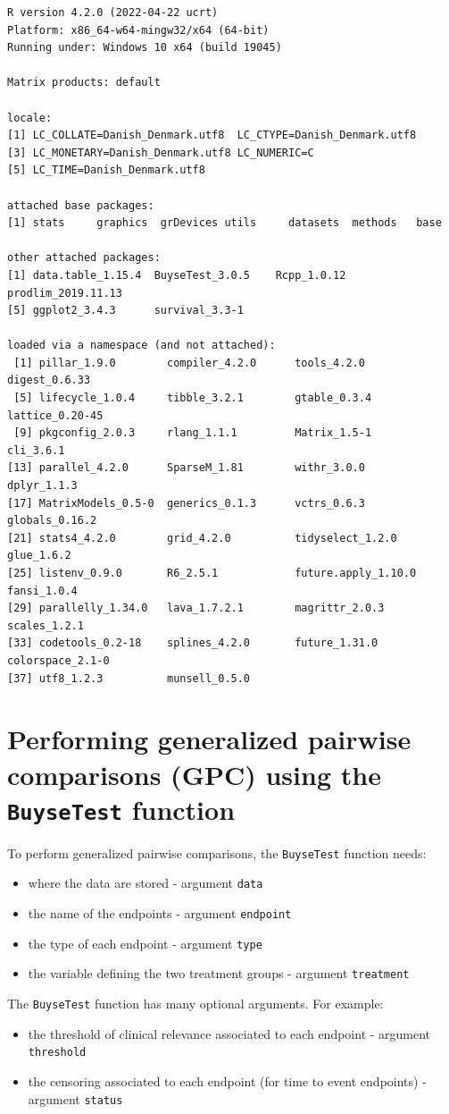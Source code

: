 \documentclass[12pt]{article}
\begin{document}
\begin{verbatim}
R version 4.2.0 (2022-04-22 ucrt)
Platform: x86_64-w64-mingw32/x64 (64-bit)
Running under: Windows 10 x64 (build 19045)

Matrix products: default

locale:
[1] LC_COLLATE=Danish_Denmark.utf8  LC_CTYPE=Danish_Denmark.utf8   
[3] LC_MONETARY=Danish_Denmark.utf8 LC_NUMERIC=C                   
[5] LC_TIME=Danish_Denmark.utf8    

attached base packages:
[1] stats     graphics  grDevices utils     datasets  methods   base     

other attached packages:
[1] data.table_1.15.4  BuyseTest_3.0.5    Rcpp_1.0.12        prodlim_2019.11.13
[5] ggplot2_3.4.3      survival_3.3-1    

loaded via a namespace (and not attached):
 [1] pillar_1.9.0        compiler_4.2.0      tools_4.2.0         digest_0.6.33      
 [5] lifecycle_1.0.4     tibble_3.2.1        gtable_0.3.4        lattice_0.20-45    
 [9] pkgconfig_2.0.3     rlang_1.1.1         Matrix_1.5-1        cli_3.6.1          
[13] parallel_4.2.0      SparseM_1.81        withr_3.0.0         dplyr_1.1.3        
[17] MatrixModels_0.5-0  generics_0.1.3      vctrs_0.6.3         globals_0.16.2     
[21] stats4_4.2.0        grid_4.2.0          tidyselect_1.2.0    glue_1.6.2         
[25] listenv_0.9.0       R6_2.5.1            future.apply_1.10.0 fansi_1.0.4        
[29] parallelly_1.34.0   lava_1.7.2.1        magrittr_2.0.3      scales_1.2.1       
[33] codetools_0.2-18    splines_4.2.0       future_1.31.0       colorspace_2.1-0   
[37] utf8_1.2.3          munsell_0.5.0
\end{verbatim}

\clearpage

\section{Performing generalized pairwise comparisons (GPC) using the \texttt{BuyseTest} function}
\label{sec:org4bd0e25}

To perform generalized pairwise comparisons, the \texttt{BuyseTest} function needs:
\begin{itemize}
\item where the data are stored \hfill - argument \texttt{data}
\item the name of the endpoints \hfill - argument \texttt{endpoint}
\item the type of each endpoint \hfill - argument \texttt{type}
\item the variable defining the two treatment groups \hfill - argument
\texttt{treatment}
\end{itemize}
The \texttt{BuyseTest} function has many optional arguments. For example:
\begin{itemize}
\item the threshold of clinical relevance associated to each endpoint \hfill - argument \texttt{threshold}
\item the censoring associated to each endpoint (for time to event endpoints) \hfill - argument \texttt{status}
\end{itemize}
\end{document}
